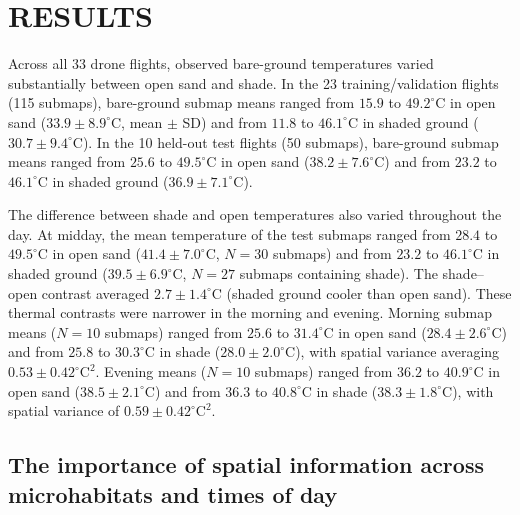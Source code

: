 \documentclass[12pt]{article}
\begin{document}
\section{RESULTS}

\noindent Across all 33 drone flights, observed bare-ground temperatures varied substantially between open sand and shade. In the 23 training/validation flights (115 submaps), bare-ground submap means ranged from $15.9$ to $49.2^\circ\mathrm{C}$ in open sand ($33.9 \pm 8.9^\circ\mathrm{C}$, mean $\pm$ SD) and from $11.8$ to $46.1^\circ\mathrm{C}$ in shaded ground ($30.7 \pm 9.4^\circ\mathrm{C}$). In the 10 held-out test flights (50 submaps), bare-ground submap means ranged from $25.6$ to $49.5^\circ\mathrm{C}$ in open sand ($38.2 \pm 7.6^\circ\mathrm{C}$) and from $23.2$ to $46.1^\circ\mathrm{C}$ in shaded ground ($36.9 \pm 7.1^\circ\mathrm{C}$). 

The difference between shade and open temperatures also varied throughout the day. At midday, the mean temperature of the test submaps ranged from $28.4$ to $49.5^\circ\mathrm{C}$ in open sand ($41.4 \pm 7.0^\circ\mathrm{C}$, $N = 30$ submaps) and from $23.2$ to $46.1^\circ\mathrm{C}$ in shaded ground ($39.5 \pm 6.9^\circ\mathrm{C}$, $N = 27$ submaps containing shade). 
The shade--open contrast averaged $2.7 \pm 1.4^\circ\mathrm{C}$ (shaded ground cooler than open sand). These thermal contrasts were narrower in the morning and evening. Morning submap means ($N = 10$ submaps) ranged from $25.6$ to $31.4^\circ\mathrm{C}$ in open sand ($28.4 \pm 2.6^\circ\mathrm{C}$) and from $25.8$ to $30.3^\circ\mathrm{C}$ in shade ($28.0 \pm 2.0^\circ\mathrm{C}$), with spatial variance averaging $0.53 \pm 0.42^{\circ}\mathrm{C}^2$. Evening means ($N = 10$ submaps) ranged from $36.2$ to $40.9^\circ\mathrm{C}$ in open sand ($38.5 \pm 2.1^\circ\mathrm{C}$) and from $36.3$ to $40.8^\circ\mathrm{C}$ in shade ($38.3 \pm 1.8^\circ\mathrm{C}$), with spatial variance of $0.59 \pm 0.42^{\circ}\mathrm{C}^2$.

\subsection{The importance of spatial information across microhabitats and times of day}
\end{document}
